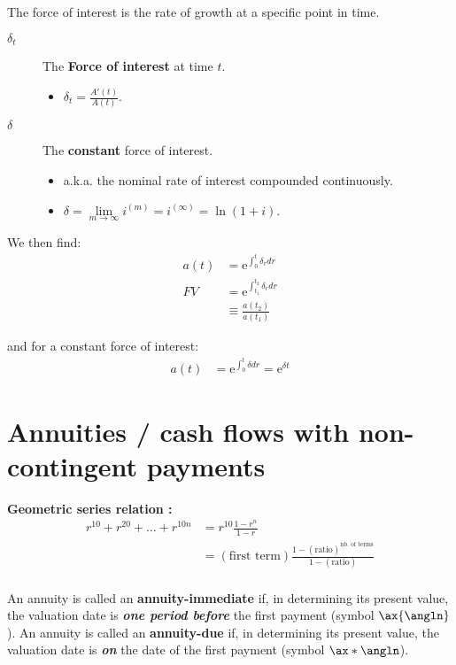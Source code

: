 \documentclass[10pt, french]{article}
\def\SectionColor{cobalt}
\begin{document}
\begin{multicols*}{2}
The force of interest is the rate of growth at a specific point in time.
\begin{distributions}
\begin{description}
	\item[$\delta_{t}$]	The \textbf{Force of interest} at time $t$.
		\begin{itemize}[leftmargin = *]
		\item	$\delta_{t} = \frac{A'(t)}{A(t)}$.
		\end{itemize}
	\item[$\delta$]	The \textbf{constant} force of interest.
		\begin{itemize}[leftmargin = *]
		\item	a.k.a. the nominal rate of interest compounded continuously.
		\item	$\delta = \underset{m \rightarrow \infty}{\lim} i^{(m)} = i^{(\infty)} = \ln(1 + i)$.
		\end{itemize}
\end{description}
\end{distributions}

We then find:
\begin{align*}
	a(t)
	&=	\textrm{e}^{\int_{0}^{t}\delta_{r}dr}	\\
	FV
	&=	\textrm{e}^{\int_{t_{1}}^{t_{2}}\delta_{r} dr}	\\
	&\equiv	\frac{a(t_{2})}{a(t_{1})}	
\end{align*}

and for a constant force of interest: 
\begin{align*}
	a(t)	
	&=	\textrm{e}^{\int_{0}^{t}\delta dr}	
	=	\textrm{e}^{\delta t}
\end{align*}


\newpage
\def\SectionColor{blue!80!white}
\section{Annuities / cash flows with non-contingent payments}
\textbf{Geometric series relation :}
\begin{align*}
	r^{10} + r^{20} + \dots + r^{10n}
	&=	r^{10}\frac{1 - r^{n}}{1 - r}	\\
	&=	(\text{first term}) \frac{1 - (\text{ratio})^{\text{nb. of terms}}}{1 - (\text{ratio})} 	\\
\end{align*}

\begin{definitionNOHFILL}[Annuity]
An annuity is called an \textbf{annuity-immediate} if, in determining its present value, the valuation date is \textbf{\textit{one period before}} the first payment (symbol $\ax{\angln}$). An annuity is called an \textbf{annuity-due} if, in determining its present value, the valuation date is \textit{\textbf{on}} the date of the first payment (symbol $\ax*{\angln}$).


\end{definitionNOHFILL}
\end{multicols*}
\end{document}
